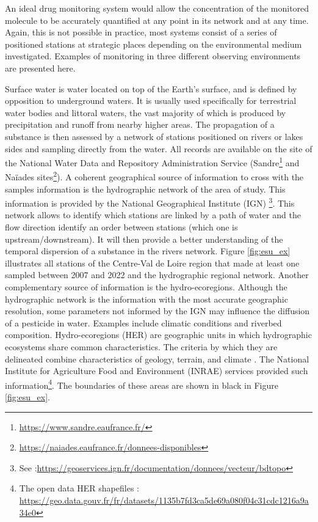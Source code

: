 An ideal drug monitoring system would allow the concentration of the monitored molecule to be accurately quantified at any point in its network and at any time. Again, this is not possible in practice, most systems consist of a series of positioned stations at strategic places depending on the environmental medium investigated. Examples of monitoring in three different observing environments are presented here.  

Surface water is water located on top of the Earth's surface, and is defined by opposition to underground waters. It is usually used specifically for terrestrial water bodies and littoral waters, the vast majority of which is produced by precipitation and runoff from nearby higher areas. The propagation of a substance is then assessed by a network of stations positioned on rivers or lakes sides and sampling directly from the water. All records are available on the site of the National Water Data and Repository Administration Service (Sandre\footnote{\url{https://www.sandre.eaufrance.fr/}} and Naïades sites\footnote{\url{https://naiades.eaufrance.fr/donnees-disponibles}}). A coherent geographical source of information to cross with the samples information is the hydrographic network of the area of study. This information is provided by the National Geographical Institute (IGN) \footnote{See :\url{https://geoservices.ign.fr/documentation/donnees/vecteur/bdtopo}}. This network allows to identify which stations are linked by a path of water and the flow direction identify an order between stations (which one is upstream/downstream). It will then provide a better understanding of the temporal dispersion of a substance in the rivers network. Figure \ref{fig:esu_ex} illustrates all stations of the Centre-Val de Loire region that made at least one sampled between 2007 and 2022 and the hydrographic regional network. Another complementary source of information is the hydro-ecoregions. Although the hydrographic network is the information with the most accurate geographic resolution, some parameters not informed by the IGN may influence the diffusion of a pesticide in water. Examples include climatic conditions and riverbed composition. Hydro-ecoregions (HER) are geographic units in which hydrographic ecosystems share common characteristics. The criteria by which they are delineated combine characteristics of geology, terrain, and climate \cite{wasson:hal-02580774}. The National Institute for Agriculture Food and Environment (INRAE) services provided such information\footnote{The open data HER shapefiles : \url{https://geo.data.gouv.fr/fr/datasets/1135b7fd3ca5de69a080f04c31cdc1216a9a34e0}}. The boundaries of these areas are shown in black in Figure \ref{fig:esu_ex}. 

